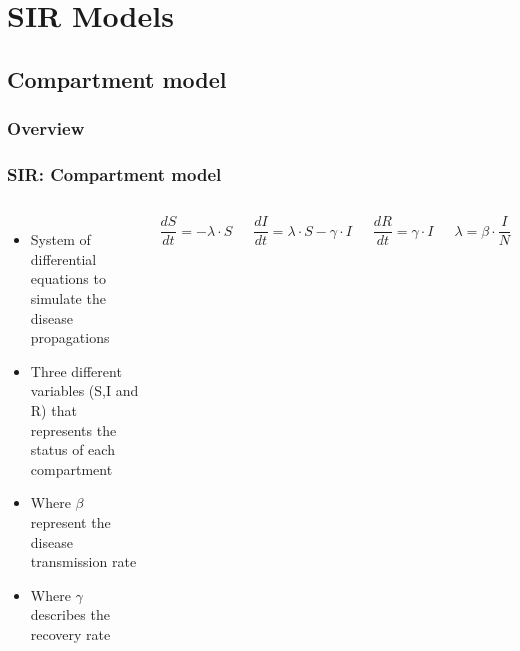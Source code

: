 \documentclass{beamer}
\begin{document}
\section{SIR Models}


\subsection{Compartment model}


\begin{frame}
\frametitle{Overview} %
\tableofcontents[currentsection] %
\end{frame}

\begin{frame}
\frametitle{SIR: Compartment model}
\begin{columns}[c] %


\begin{itemize}
\item System of differential equations to simulate the disease propagations
\item Three different variables (S,I and R) that represents the status of each compartment
\item Where $\beta$ represent the disease transmission rate
\item Where $\gamma$ describes the recovery rate
\end{itemize}


\begin{equation}
\frac{\textit{d}S}{\textit{dt}} =-\lambda \cdot S \nonumber
\end{equation}

\begin{equation}
\frac{\textit{d}I}{\textit{dt}} =\lambda \cdot S - \gamma \cdot I \nonumber
\end{equation}

\begin{equation}
\frac{\textit{d}R}{\textit{dt}} =\gamma \cdot I \nonumber
\end{equation}

\begin{equation}
\lambda= \beta \cdot \frac{I}{N} \nonumber
\end{equation} 

\end{columns}
\end{frame}
\end{document}
